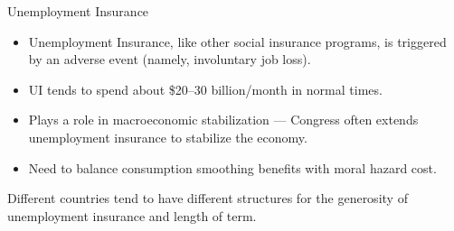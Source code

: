 \documentclass[8pt]{extarticle}
\begin{document}
  \begin{problem}{Unemployment Insurance}
    \begin{itemize}
      \item Unemployment Insurance, like other social insurance programs, is triggered by an adverse event (namely, involuntary job loss).
      \item UI tends to spend about \$20--30 billion/month in normal times.
      \item Plays a role in macroeconomic stabilization --- Congress often extends unemployment insurance to stabilize the economy.
      \item Need to balance consumption smoothing benefits with moral hazard cost.
    \end{itemize}
    Different countries tend to have different structures for the generosity of unemployment insurance and length of term.
  \end{problem}
\end{document}
